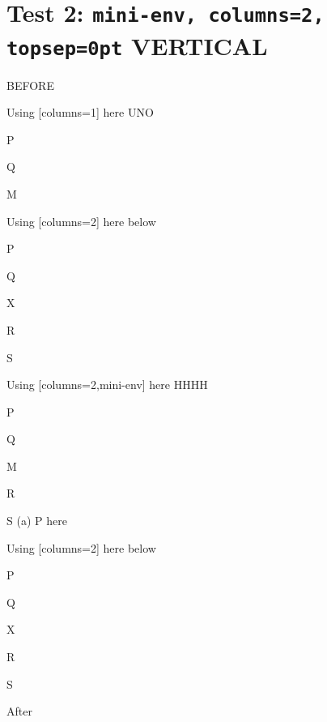\documentclass[10pt]{article}
\begin{document}
\newpage

\section{Test 2: \texttt{mini-env, columns=2, topsep=0pt} VERTICAL}

BEFORE
\begin{enumext}[columns=2]
\item Using [columns=1] here UNO

  \begin{enumext}[columns=1,topsep=0pt]%
     \item  P \item Q \item M %
  \end{enumext}

\item Using [columns=2] here below

\begin{enumext}[columns=2]%
     \item  P \item Q \item X  \item R \item S
  \end{enumext}

\columnbreak

\item Using [columns=2,mini-env] here HHHH

  \begin{enumext}[columns=2,mini-env={0.4\linewidth},topsep=0pt]%
    \item  P \item Q \item M \item R \item S
    \miniright
    (a) P here
  \end{enumext}

\item Using [columns=2] here below

\begin{enumext}[columns=2]%
     \item  P \item Q \item X  \item R \item S
  \end{enumext}

\end{enumext}
After
\end{document}
